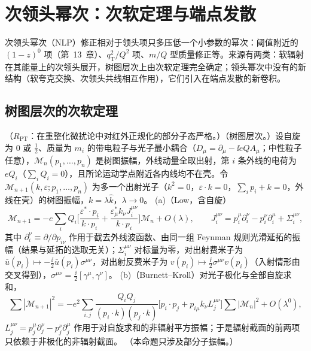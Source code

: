 \section{次领头幂次：次软定理与端点发散}\label{sec:power-nlp}

次领头幂次（NLP）修正相对于领头项只多压低一个小参数的幂次：阈值附近的 $(1-z)^0$ 项（第~13~章）、$q_{\mathrm T}^2/Q^2$ 项、$m/Q$ 型质量修正等。来源有两类：软辐射在其能量上的次领头展开，树图层次上由次软定理完全确定；领头幂次中没有的新结构（软夸克交换、次领头共线相互作用），它们引入在端点发散的新卷积。

\subsection{树图层次的次软定理}

\begin{proposition}\label{prop:power-next-to-soft}
（$R_{\mathrm{PT}}$：在重整化微扰论中对红外正规化的部分子态严格。）（树图层次。）设自旋为 0 或 $\frac12$、质量为 $m_i$ 的带电粒子与光子最小耦合（$D_\mu=\partial_\mu-\ii eQA_\mu$；中性粒子任意），$\mathcal M_n(p_1,\dots,p_n)$ 是树图振幅，外线动量全取出射，第 $i$ 条外线的电荷为 $eQ_i$（$\sum_iQ_i=0$），且所论运动学点附近各内线均不在壳。令 $\mathcal M_{n+1}(k,\varepsilon;p_1,\dots,p_n)$ 为多一个出射光子（$k^2=0$，$\varepsilon\cdot k=0$，$\sum_ip_i+k=0$，外线在壳）的树图振幅，$k=\lambda\hat k$，$\lambda\to0$。
(a)（Low，含自旋）
\begin{equation}\label{eq:power-lbk}
\mathcal M_{n+1}=-e\sum_iQ_i\Big[\frac{\varepsilon^*\!\cdot p_i}{k\cdot p_i}+\frac{\varepsilon^*_\mu k_\nu J_i^{\mu\nu}}{k\cdot p_i}\Big]\mathcal M_n+O(\lambda),\qquad
J_i^{\mu\nu}=p_i^\mu\partial_i^\nu-p_i^\nu\partial_i^\mu+\Sigma_i^{\mu\nu},
\end{equation}
其中 $\partial_i^\nu\equiv\partial/\partial p_{i\nu}$ 作用于截去外线波函数、由同一组 Feynman 规则光滑延拓的振幅（结果与延拓的选取无关）；$\Sigma_i^{\mu\nu}$ 对标量为零，对出射费米子为 $\bar u(p_i)\mapsto-\frac{\ii}{2}\bar u(p_i)\sigma^{\mu\nu}$，对出射反费米子为 $v(p_i)\mapsto\frac{\ii}{2}\sigma^{\mu\nu}v(p_i)$（入射情形由交叉得到），$\sigma^{\mu\nu}=\frac{\ii}{2}[\gamma^\mu,\gamma^\nu]$。
(b)（Burnett--Kroll）对光子极化与全部自旋求和，
\begin{equation}\label{eq:power-bk}
\sum|\mathcal M_{n+1}|^2=-e^2\sum_{i,j}\frac{Q_iQ_j}{(p_i\cdot k)(p_j\cdot k)}\Big[p_i\cdot p_j+p_{i\mu}k_\nu L_j^{\mu\nu}\Big]\sum|\mathcal M_n|^2+O(\lambda^0),
\end{equation}
$L_j^{\mu\nu}=p_j^\mu\partial_j^\nu-p_j^\nu\partial_j^\mu$ 作用于对自旋求和的非辐射平方振幅；于是辐射截面的前两项只依赖于非极化的非辐射截面。
（本命题只涉及部分子振幅。）
\end{proposition}

